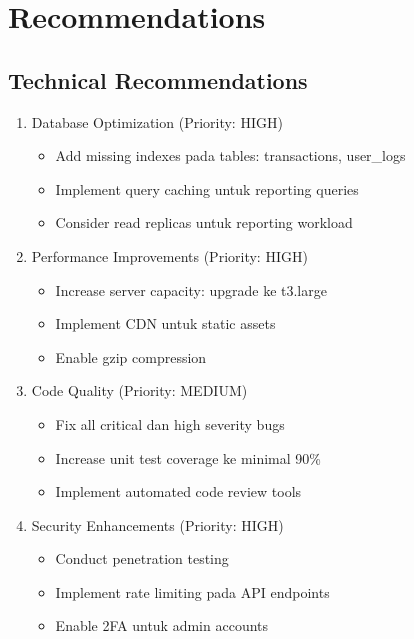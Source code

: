 \documentclass[12pt,a4paper]{article}
\begin{document}
\section{Recommendations}
\subsection{Technical Recommendations}
\begin{enumerate}
  \item Database Optimization (Priority: HIGH)
  \begin{itemize}
    \item Add missing indexes pada tables: transactions, user\_logs
    \item Implement query caching untuk reporting queries
    \item Consider read replicas untuk reporting workload
  \end{itemize}
  \item Performance Improvements (Priority: HIGH)
  \begin{itemize}
    \item Increase server capacity: upgrade ke t3.large
    \item Implement CDN untuk static assets
    \item Enable gzip compression
  \end{itemize}
  \item Code Quality (Priority: MEDIUM)
  \begin{itemize}
    \item Fix all critical dan high severity bugs
    \item Increase unit test coverage ke minimal 90\%
    \item Implement automated code review tools
  \end{itemize}
  \item Security Enhancements (Priority: HIGH)
  \begin{itemize}
    \item Conduct penetration testing
    \item Implement rate limiting pada API endpoints
    \item Enable 2FA untuk admin accounts
  \end{itemize}
\end{enumerate}
\end{document}
